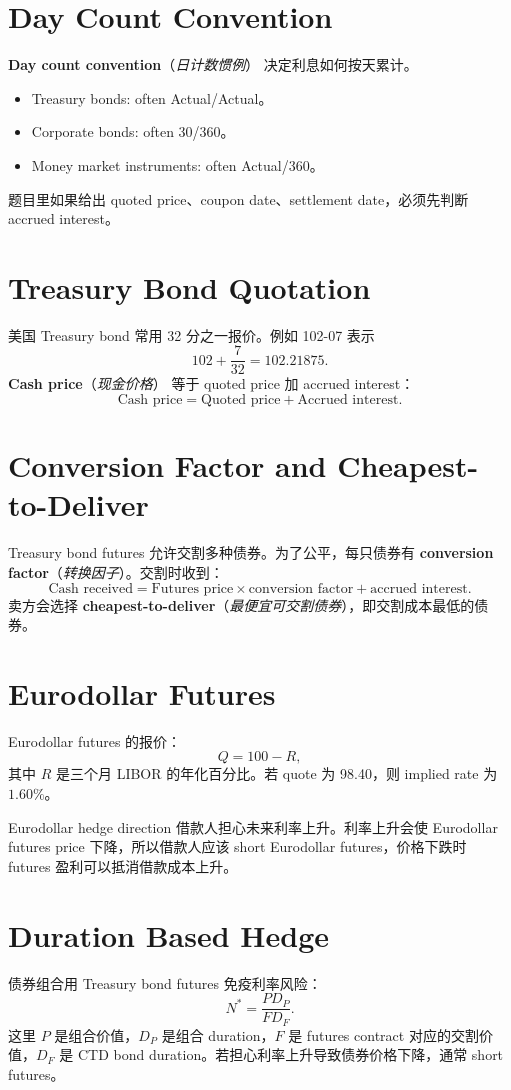\documentclass[11pt,a4paper,openany]{ctexbook}
\newcommand{\term}[2]{\textbf{#1}（\emph{#2}）}
\begin{document}
\section{Day Count Convention}
\term{Day count convention}{日计数惯例} 决定利息如何按天累计。
\begin{itemize}
  \item Treasury bonds: often Actual/Actual。
  \item Corporate bonds: often 30/360。
  \item Money market instruments: often Actual/360。
\end{itemize}
题目里如果给出 quoted price、coupon date、settlement date，必须先判断 accrued interest。

\section{Treasury Bond Quotation}
美国 Treasury bond 常用 32 分之一报价。例如 102-07 表示
\[
102+\frac{7}{32}=102.21875.
\]
\term{Cash price}{现金价格} 等于 quoted price 加 accrued interest：
\[
\text{Cash price}=\text{Quoted price}+\text{Accrued interest}.
\]

\section{Conversion Factor and Cheapest-to-Deliver}
Treasury bond futures 允许交割多种债券。为了公平，每只债券有 \term{conversion factor}{转换因子}。交割时收到：
\[
\text{Cash received}=\text{Futures price}\times \text{conversion factor}+\text{accrued interest}.
\]
卖方会选择 \term{cheapest-to-deliver}{最便宜可交割债券}，即交割成本最低的债券。

\section{Eurodollar Futures}
Eurodollar futures 的报价：
\[
Q=100-R,
\]
其中 $R$ 是三个月 LIBOR 的年化百分比。若 quote 为 98.40，则 implied rate 为 $1.60\%$。

\begin{warningbox}{Eurodollar hedge direction}
借款人担心未来利率上升。利率上升会使 Eurodollar futures price 下降，所以借款人应该 short Eurodollar futures，价格下跌时 futures 盈利可以抵消借款成本上升。
\end{warningbox}

\section{Duration Based Hedge}
债券组合用 Treasury bond futures 免疫利率风险：
\[
N^\ast=\frac{P D_P}{F D_F}.
\]
这里 $P$ 是组合价值，$D_P$ 是组合 duration，$F$ 是 futures contract 对应的交割价值，$D_F$ 是 CTD bond duration。若担心利率上升导致债券价格下降，通常 short futures。
\end{document}
